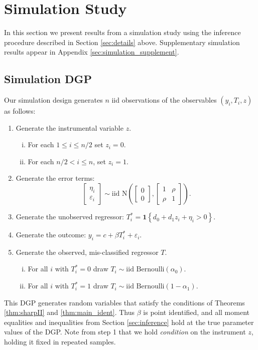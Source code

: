 \section{Simulation Study}

In this section we present results from a simulation study using the inference procedure described in Section \ref{sec:details} above.
Supplementary simulation results appear in Appendix \ref{sec:simulation_supplement}.

\subsection{Simulation DGP}
\label{sec:DGP}
Our simulation design generates $n$ iid observations of the observables $(y_i, T_i, z)$ as follows:
\begin{enumerate}
  \item Generate the instrumental variable $z$.
    \begin{enumerate}[(i)]
      \item For each $1 \leq i \leq n/2$ set $z_i = 0$.
      \item For each $n/2 < i \leq n$, set $z_i = 1$.
    \end{enumerate}
  \item Generate the error terms: 
    \[
      \left[
      \begin{array}{c}
        \eta_i \\ \varepsilon_i
      \end{array}
    \right] \sim \mbox{iid N}\left( \left[
\begin{array}{c}
  0 \\ 0
\end{array}
\right], \left[
\begin{array}{cc}
  1 & \rho \\
  \rho & 1
\end{array}
\right]\right).
\]
  \item Generate the unobserved regressor: $T^*_i = \mathbf{1}\left\{ d_0 + d_1 z_i + \eta_i > 0 \right\}$.
  \item Generate the outcome: $y_i = c + \beta T_i^* + \varepsilon_i$.  
  \item Generate the observed, mis-classified regressor $T$.
    \begin{enumerate}[(i)]
      \item For all $i$ with $T^*_i = 0$ draw $T_i \sim \mbox{iid Bernoulli}(\alpha_0)$. 
      \item For all $i$ with $T^*_i = 1$ draw $T_i \sim \mbox{iid Bernoulli}(1 - \alpha_1)$.
    \end{enumerate}
\end{enumerate}
This DGP generates random variables that satisfy the conditions of Theorems \ref{thm:sharpII} and \ref{thm:main_ident}.
Thus $\beta$ is point identified, and all moment equalities and inequalities from Section \ref{sec:inference} hold at the true parameter values of the DGP.
Note from step 1 that we hold \emph{condition} on the instrument $z$, holding it fixed in repeated samples.

